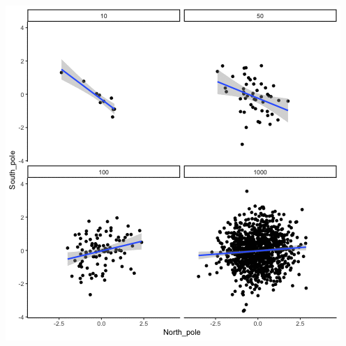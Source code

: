 \documentclass[]{book}
\begin{document}
\includegraphics{gifs/corNormFourNsTypeI-1.gif}
\end{document}

